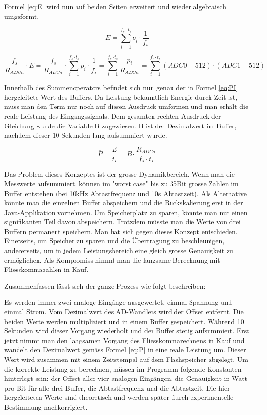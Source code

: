 Formel \ref{eq:E} wird nun auf beiden Seiten erweitert und wieder algebraisch umgeformt.

$$E=\sum_{i=1}^{f_s \cdot t_s} p_i \cdot \frac{1}{f_s}$$

$$\frac{f_s}{R_{ADCn}}\cdot E =\frac{f_s}{R_{ADCn}}\cdot \sum_{i=1}^{f_s \cdot t_s} p_i \cdot \frac{1}{f_s} = \sum_{i=1}^{f_s \cdot t_s} \frac{p_i}{R_{ADCn}} = \sum_{i=1}^{f_s \cdot t_s} (ADC0-512)\cdot(ADC1 -512)$$

Innerhalb des Summenoperators befindet sich nun genau der in Formel \ref{eq:PI} hergeleitete Wert des Buffers. Da Leistung bekanntlich Energie durch Zeit ist, muss man den Term nur noch auf diesen Ausdruck umformen und man erhält die reale Leistung des Eingangssignals. Dem gesamten rechten Ausdruck der Gleichung wurde die Variable B zugewiesen. B ist der Dezimalwert im Buffer, nachdem dieser 10 Sekunden lang aufsummiert wurde.

\begin{equation}
\overline{P} = \frac{E}{t_s} = B \cdot \frac{R_{ADCn}}{f_s \cdot t_s}
\label{eq:P}
\end{equation}

Das Problem dieses Konzeptes ist der grosse Dynamikbereich. Wenn man die Messwerte aufsummiert, können im "worst case"  bis zu 35Bit grosse Zahlen im Buffer entstehen (bei 10kHz Abtastfrequenz und 10s Abtastzeit). Als Alternative könnte man die einzelnen Buffer abspeichern und die Rückskalierung erst in der Java-Applikation vornehmen. Um Speicherplatz zu sparen, könnte man nur einen signifikanten Teil davon abspeichern. Trotzdem müsste man die Werte von drei Buffern permanent speichern. Man hat sich gegen dieses Konzept entschieden. Einerseits, um Speicher zu sparen und die Übertragung zu beschleunigen, andererseits, um in jedem Leistungsbereich eine gleich grosse Genauigkeit zu ermöglichen. Als Kompromiss nimmt man die langsame Berechnung mit Fliesskommazahlen in Kauf.

Zusammenfassen lässt sich der ganze Prozess wie folgt beschreiben:

Es werden immer zwei analoge Eingänge ausgewertet, einmal Spannung und einmal Strom. Vom Dezimalwert des AD-Wandlers wird der Offset entfernt. Die beiden Werte werden multipliziert und in einem Buffer gespeichert. Während 10 Sekunden wird dieser Vorgang wiederholt und der Buffer stetig aufsummiert. Erst jetzt nimmt man den langsamen Vorgang des Fliesskommarechnens in Kauf und wandelt den Dezimalwert gemäss Formel \ref{eq:P} in eine reale Leistung um. Dieser Wert wird zusammen mit einem Zeitstempel auf dem Flashspeicher abgelegt. Um die korrekte Leistung zu berechnen, müssen im Programm folgende Konstanten hinterlegt sein: der Offset aller vier analogen Eingängen, die Genauigkeit in Watt pro Bit für alle drei Buffer, die Abtastfrequenz und die Abtastzeit. Die hier hergeleiteten Werte sind theoretisch und werden später durch experimentelle Bestimmung nachkorrigiert.

